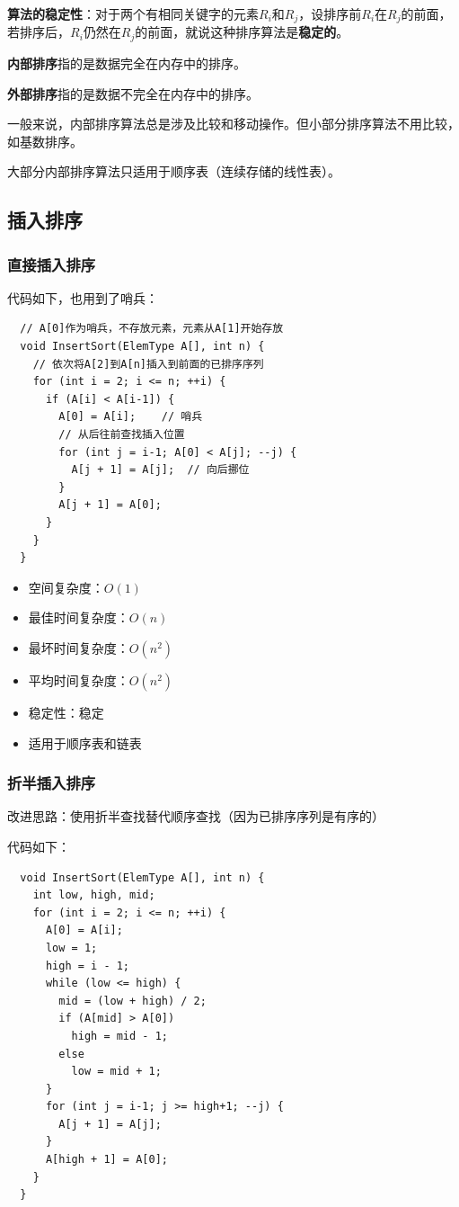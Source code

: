 \documentclass[12pt, a4paper, oneside]{ctexart}
\begin{document}
\textbf{算法的稳定性}：对于两个有相同关键字的元素$R_i$和$R_j$，设排序前$R_i$在$R_j$的前面，若排序后，$R_i$仍然在$R_j$的前面，就说这种排序算法是\textbf{稳定的}。

\textbf{内部排序}指的是数据完全在内存中的排序。

\textbf{外部排序}指的是数据不完全在内存中的排序。

一般来说，内部排序算法总是涉及比较和移动操作。但小部分排序算法不用比较，如基数排序。

大部分内部排序算法只适用于顺序表（连续存储的线性表）。

\subsection{插入排序}

\subsubsection{直接插入排序}

代码如下，也用到了哨兵：
\begin{lstlisting}
  // A[0]作为哨兵，不存放元素，元素从A[1]开始存放
  void InsertSort(ElemType A[], int n) {
    // 依次将A[2]到A[n]插入到前面的已排序序列
    for (int i = 2; i <= n; ++i) {
      if (A[i] < A[i-1]) {
        A[0] = A[i];    // 哨兵
        // 从后往前查找插入位置
        for (int j = i-1; A[0] < A[j]; --j) {
          A[j + 1] = A[j];  // 向后挪位
        }
        A[j + 1] = A[0];
      }
    }
  }
\end{lstlisting}

\begin{itemize}
  \item 空间复杂度：$O(1)$
  \item 最佳时间复杂度：$O(n)$
  \item 最坏时间复杂度：$O(n^2)$
  \item 平均时间复杂度：$O(n^2)$
  \item 稳定性：稳定
  \item 适用于顺序表和链表
\end{itemize}

\subsubsection{折半插入排序}

改进思路：使用折半查找替代顺序查找（因为已排序序列是有序的）

代码如下：
\begin{lstlisting}
  void InsertSort(ElemType A[], int n) {
    int low, high, mid;
    for (int i = 2; i <= n; ++i) {
      A[0] = A[i];
      low = 1;
      high = i - 1;
      while (low <= high) {
        mid = (low + high) / 2;
        if (A[mid] > A[0])
          high = mid - 1;
        else
          low = mid + 1;
      }
      for (int j = i-1; j >= high+1; --j) {
        A[j + 1] = A[j];
      }
      A[high + 1] = A[0];
    }
  }
\end{lstlisting}
\end{document}
